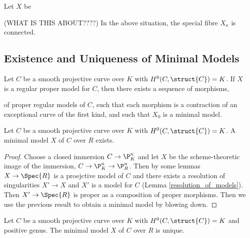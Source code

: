\begin{lemma}
Let $X$ be 
\end{lemma}

\begin{lemma}
(WHAT IS THIS ABOUT????) In the above situation, the special fibre $X_\kappa$ is connected. 
\end{lemma}

\subsection{Existence and Uniqueness of Minimal Models}

\begin{lemma}
Let $C$ be a smooth projective curve over $K$ with $H^0(C, \struct{C}) = K$. If $X$ is a regular proper model for $C$, then there exists a sequence of morphisms,
\begin{center}
\end{center}
of proper regular models of $C$, such that each morphism is a contraction of an exceptional curve of the first kind, and such that $X_0$ is a minimal model.
\end{lemma}

\begin{proposition}
Let $C$ be a smooth projective curve over $K$ with $H^0(C, \struct{C}) = K$. A minimal model $X$ of $C$ over $R$ exists.
\end{proposition}

\begin{proof}
Choose a closed immersion $C \to \P^n_K$ and let $X$ be the scheme-theoretic image of the immersion, $C \to \P^n_K \to \P^n_R$. Then by some lemmas $X \to \Spec{R}$ is a proejctive model of $C$ and there exists a resolution of singularities $X' \to X$ and $X'$ is a model for $C$ (Lemma \ref{resolution_of_models}). Then $X' \to \Spec{R}$ is proper as a composition of proper morphisms. Then we use the previous result to obtain a minimal model by blowing down.  
\end{proof}

\begin{proposition}[Tag 0C6B]
Let $C$ be a smooth projective curve over $K$ with $H^0(C, \struct{C}) = K$ and positive genus. The minimal model $X$ of $C$ over $R$ is unique.
\end{proposition}


